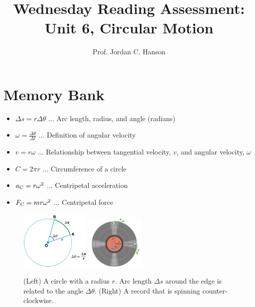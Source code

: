 \documentclass{article}
\begin{document}
\twocolumn

\title{Wednesday Reading Assessment: Unit 6, Circular Motion}
\author{Prof. Jordan C. Hanson}

\maketitle

\section{Memory Bank}

\begin{itemize}
\item $\Delta s = r \Delta \theta$ ... Arc length, radius, and angle (radians)
\item $\omega = \frac{\Delta \theta}{\Delta t}$ ... Definition of angular velocity
\item $v = r\omega $ ... Relationship between tangential velocity, $v$, and angular velocity, $\omega$
\item $C = 2\pi r$ ... Circumference of a circle
\item $a_{\rm C} = r\omega^2$ ... Centripetal acceleration
\item $F_{\rm C} = m r \omega^2$ ... Centripetal force
\end{itemize}

\begin{figure}[ht]
\centering
\includegraphics[width=0.3\textwidth]{circle.jpeg}
\includegraphics[width=0.25\textwidth]{record.png}
\caption{\label{fig:record} (Left) A circle with a radius $r$.  Arc length $\Delta s$ around the edge is related to the angle $\Delta \theta$.  (Right) A record that is spinning counter-clockwise.}
\end{figure}
\end{document}

